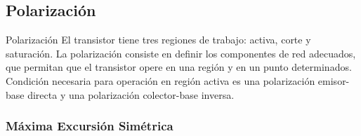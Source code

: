 \subsection{Polarización}
\begin{frame}{Polarización}
El transistor tiene tres regiones de trabajo: activa, corte y saturación. 
La polarización consiste en definir los componentes de red adecuados, que permitan
que el transistor opere en una región y en un punto determinados. Condición necesaria para
operación en región activa es una polarización emisor-base directa y una polarización
colector-base inversa.
\end{frame}

\subsubsection{Máxima Excursión Simétrica}
